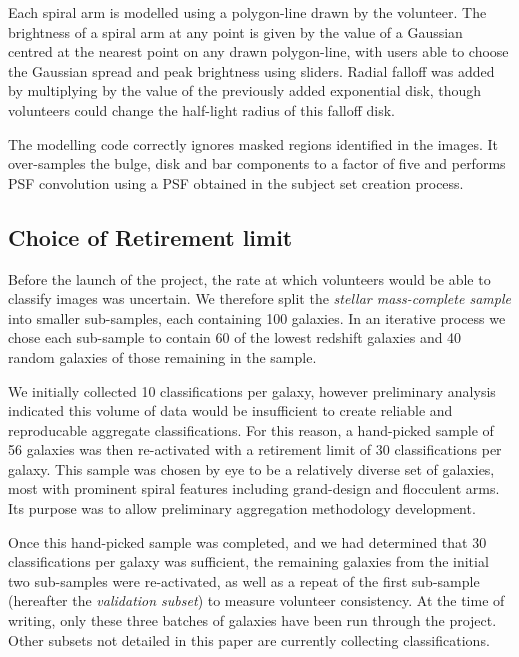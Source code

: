 \documentclass[../main.tex]{subfiles}
\begin{document}
Each spiral arm is modelled using a polygon-line drawn by the volunteer. The brightness of a spiral arm at any point is given by the value of a Gaussian centred at the nearest point on any drawn polygon-line, with users able to choose the Gaussian spread and peak brightness using sliders. Radial falloff was added by multiplying by the value of the previously added exponential disk, though volunteers could change the half-light radius of this falloff disk.

The modelling code correctly ignores masked regions identified in the images. It over-samples the bulge, disk and bar components to a factor of five and performs PSF convolution using a PSF obtained in the subject set creation process.

\subsection{Choice of Retirement limit}
\label{sec:retirement-limit}

Before the launch of the project, the rate at which volunteers would be able to classify images was uncertain. We therefore split the \textit{stellar mass-complete sample} into smaller sub-samples, each containing 100 galaxies. In an iterative process we chose each sub-sample to contain 60 of the lowest redshift galaxies and 40 random galaxies of those remaining in the sample.

We initially collected 10 classifications per galaxy, however preliminary analysis indicated this volume of data would be insufficient to create reliable and reproducable aggregate classifications. For this reason, a hand-picked sample of 56 galaxies was then re-activated with a retirement limit of 30 classifications per galaxy. This sample was chosen by eye to be a relatively diverse set of galaxies, most with prominent spiral features including grand-design and flocculent arms. Its purpose was to allow preliminary aggregation methodology development.

Once this hand-picked sample was completed, and we had determined that 30 classifications per galaxy was sufficient, the remaining galaxies from the initial two sub-samples were re-activated, as well as a repeat of the first sub-sample (hereafter the \textit{validation subset}) to measure volunteer consistency. At the time of writing, only these three batches of galaxies have been run through the project. Other subsets not detailed in this paper are currently collecting classifications.
\end{document}
